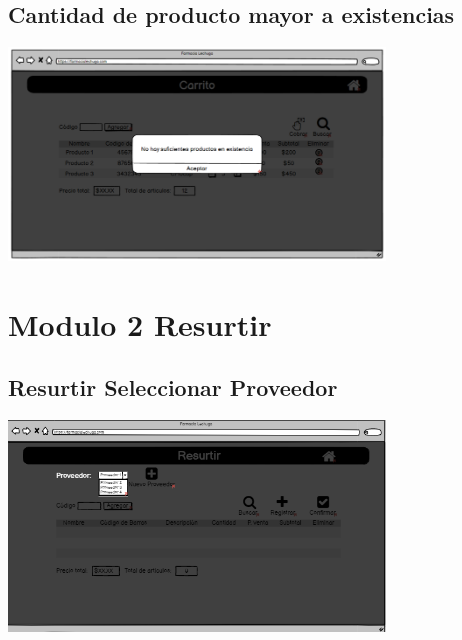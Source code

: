 \begin{flushleft}
	\subsection{Cantidad de producto mayor a existencias} \label{Cantidad de producto mayor a existencias}
	\begin{center}
		\includegraphics[width=10cm]{pantallas/images/34Escacez.png}\\	
		 	
	\end{center}
	\newpage
	\section{Modulo 2 Resurtir}
	\subsection{Resurtir Seleccionar Proveedor} \label{UI: seleccionar proveedor}
	\begin{center}
		\includegraphics[width=10cm]{pantallas/images/10resurtir.png}\\	
		 	
	\end{center}

\end{flushleft}
